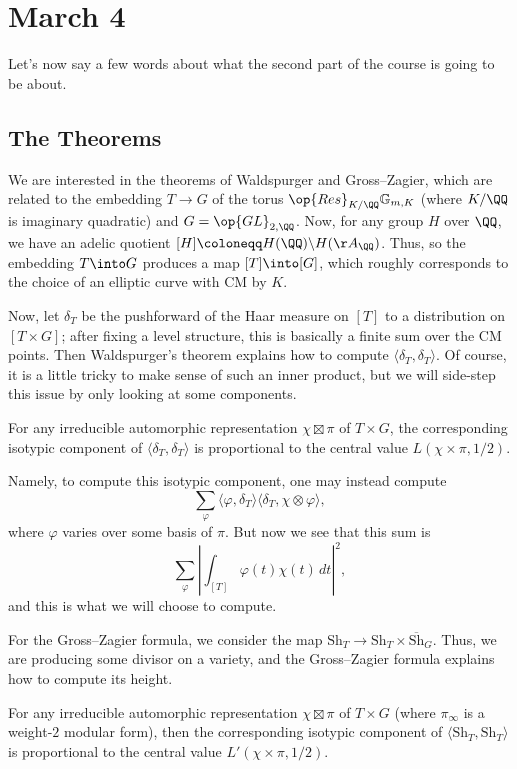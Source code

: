 \documentclass[../notes.tex]{subfiles}
\begin{document}
\section{March 4}
Let's now say a few words about what the second part of the course is going to be about.

\subsection{The Theorems}
We are interested in the theorems of Waldspurger and Gross--Zagier, which are related to the embedding $T\to G$ of the torus $\op{Res}_{K/\QQ}\mathbb G_{m,K}$ (where $K/\QQ$ is imaginary quadratic) and $G=\op{GL}_{2,\QQ}$. Now, for any group $H$ over $\QQ$, we have an adelic quotient $[H]\coloneqq H(\QQ)\backslash H(\AA_\QQ)$. Thus, so the embedding $T\into G$ produces a map $[T]\into[G]$, which roughly corresponds to the choice of an elliptic curve with CM by $K$.

Now, let $\delta_T$ be the pushforward of the Haar measure on $[T]$ to a distribution on $[T\times G]$; after fixing a level structure, this is basically a finite sum over the CM points. Then Waldspurger's theorem explains how to compute $\langle\delta_T,\delta_T\rangle$. Of course, it is a little tricky to make sense of such an inner product, but we will side-step this issue by only looking at some components.
\begin{theorem}
	For any irreducible automorphic representation $\chi\boxtimes\pi$ of $T\times G$, the corresponding isotypic component of $\langle\delta_T,\delta_T\rangle$ is proportional to the central value $L(\chi\times\pi,1/2)$.
\end{theorem}
Namely, to compute this isotypic component, one may instead compute
\[\sum_{\varphi}\langle\varphi,\delta_T\rangle\langle\delta_T,\chi\otimes\varphi\rangle,\]
where $\varphi$ varies over some basis of $\pi$. But now we see that this sum is
\[\sum_\varphi\left|\int_{[T]}\varphi(t)\chi(t)\,dt\right|^2,\]
and this is what we will choose to compute.

For the Gross--Zagier formula, we consider the map $\mathrm{Sh}_T\to\mathrm{Sh}_T\times\overline{\mathrm{Sh}}_G$. Thus, we are producing some divisor on a variety, and the Gross--Zagier formula explains how to compute its height.
\begin{theorem}
	For any irreducible automorphic representation $\chi\boxtimes\pi$ of $T\times G$ (where $\pi_\infty$ is a weight-$2$ modular form), then the corresponding isotypic component of $\langle\mathrm{Sh}_T,\mathrm{Sh}_T\rangle$ is proportional to the central value $L'(\chi\times\pi,1/2)$.
\end{theorem}
\end{document}
